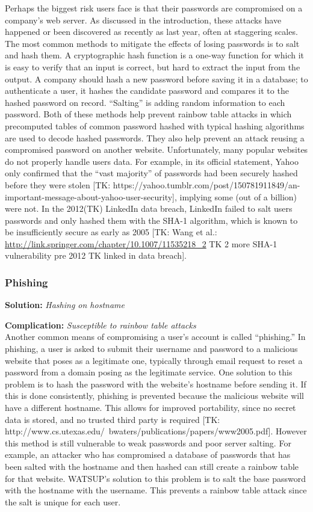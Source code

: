 Perhaps the biggest risk users face is that their passwords are compromised on a company’s web server. As discussed in the introduction, these attacks have happened or been discovered as recently as last year, often at staggering scales. The most common methods to mitigate the effects of losing passwords is to salt and hash them. A cryptographic hash function is a one-way function for which it is easy to verify that an input is correct, but hard to extract the input from the output. A company should hash a new password before saving it in a database; to authenticate a user, it hashes the candidate password and compares it to the hashed password on record. “Salting” is adding random information to each password. Both of these methods help prevent rainbow table attacks in which precomputed tables of common password hashed with typical hashing algorithms are used to decode hashed passwords. They also help prevent an attack reusing a compromised password on another website. Unfortunately, many popular websites do not properly handle users data. For example, in its official statement, Yahoo only confirmed that the “vast majority” of passwords had been securely hashed before they were stolen [TK: https://yahoo.tumblr.com/post/150781911849/an-important-message-about-yahoo-user-security], implying some (out of a billion) were not. In the 2012(TK) LinkedIn data breach, LinkedIn failed to  salt users passwords and only hashed them with the SHA-1 algorithm, which is known to be insufficiently secure as early as 2005 [TK: Wang et al.: \url{http://link.springer.com/chapter/10.1007/11535218_2} TK 2 more SHA-1 vulnerability pre 2012 TK linked in data breach].


\subsubsection{Phishing}

\textbf{Solution:} \emph{Hashing on hostname}

\noindent\textbf{Complication:} \emph{Susceptible to rainbow table attacks}\\

Another common means of compromising a user’s account is called “phishing.” In phishing, a user is asked to submit their username and password to a malicious website that poses as a legitimate one, typically through email request to reset a password from a domain posing as the legitimate service. One solution to this problem is to hash the password with the website’s hostname before sending it. If this is done consistently, phishing is prevented because the malicious website will have a different hostname. This allows for improved portability, since no secret data is stored, and no trusted third party is required [TK: http://www.cs.utexas.edu/~bwaters/publications/papers/www2005.pdf]. However this method is still vulnerable to weak passwords and poor server salting. For example, an attacker who has compromised a database of passwords that has been salted with the hostname and then hashed can still create a rainbow table for that website. WATSUP’s solution to this problem is to salt the base password with the hostname with the username. This prevents a rainbow table attack since the salt is unique for each user.


